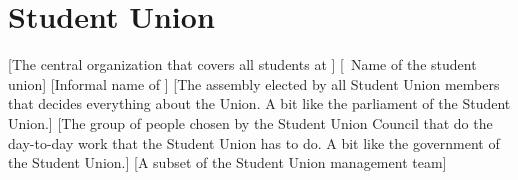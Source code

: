 \documentclass[a4paper]{article}
\begin{document}
\section{Student Union}
\begin{description}
    [The central organization that covers all students at ]
    [\formal~Name of the student union]
    [Informal name of ]
    [The assembly elected by all Student Union members that decides everything about the Union. A bit like the parliament of the Student Union.]
    [The group of people chosen by the Student Union Council that do the day-to-day work that the Student Union has to do. A bit like the government of the Student Union.]
    [A subset of the Student Union management team]
\end{description}
\end{document}
